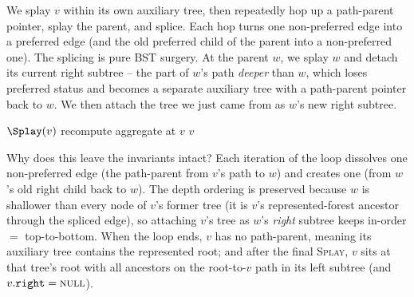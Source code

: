 We splay $v$ within its own auxiliary tree, then repeatedly hop up a path-parent
pointer, splay the parent, and splice. Each hop turns one non-preferred edge into
a preferred edge (and the old preferred child of the parent into a
non-preferred one). The splicing is pure BST surgery. At the parent $w$, we splay $w$ and detach its
current right subtree -- the part of $w$'s path \emph{deeper} than $w$, which
loses preferred status and becomes a separate auxiliary tree with a path-parent
pointer back to $w$. We then attach the tree we just came from as $w$'s new right
subtree.

\begin{algorithm}[H]
\caption{$\textsc{Access}(v)$ -- make $v$ the deep end of the root's preferred path}
\label{ch22:alg-access}
\DontPrintSemicolon
{}
$\Splay(v)$\;
recompute aggregate at $v$\;
\Return $v$\;
\end{algorithm}

\begin{whybox}
Why does this leave the invariants intact? Each iteration of the loop dissolves
one non-preferred edge (the path-parent from $v$'s path to $w$) and creates one
(from $w$'s old right child back to $w$). The depth ordering is preserved because
$w$ is shallower than every node of $v$'s former tree (it is $v$'s
represented-forest ancestor through the spliced edge), so attaching $v$'s tree as
$w$'s \emph{right} subtree keeps in-order $=$ top-to-bottom. When the loop ends,
$v$ has no path-parent, meaning its auxiliary tree contains the represented root;
and after the final \textsc{Splay}, $v$ sits at that tree's root with all ancestors
on the root-to-$v$ path in its left subtree (and $v.\texttt{right}=\textsc{null}$).
\end{whybox}

